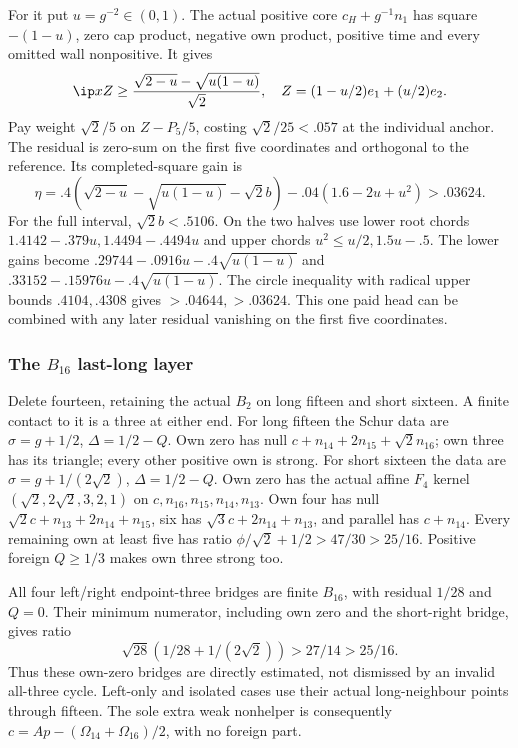 For it put \(u=g^{-2}\in(0,1)\). The actual positive core
\(c_H+g^{-1}n_1\) has square \(-(1-u)\), zero cap product,
negative own product, positive time and every omitted wall nonpositive.
It gives
\[
 \ip xZ\ge{\sqrt{2-u}-\sqrt{u(1-u)}\over\sqrt2},
 \quad Z=(1-u/2)e_1+(u/2)e_2.
\]
Pay weight \(\sqrt2/5\) on \(Z-P_5/5\), costing
\(\sqrt2/25<.057\) at the individual anchor. The residual
is zero-sum on the first five coordinates and orthogonal to the
reference. Its completed-square gain is
\[
 \eta=.4(\sqrt{2-u}-\sqrt{u(1-u)}-\sqrt2b)
                  -.04(1.6-2u+u^2)>.03624.
\]
For the full interval, \(\sqrt2b<.5106\). On the two halves use
lower root chords \(1.4142-.379u,1.4494-.4494u\) and upper
chords \(u^2\le u/2,1.5u-.5\). The lower gains become
\(.29744-.0916u-.4\sqrt{u(1-u)}\) and
\(.33152-.15976u-.4\sqrt{u(1-u)}\).
The circle inequality with radical upper bounds \(.4104,.4308\)
gives \(>.04644,>.03624\). This one paid head can be combined
with any later residual vanishing on the first five coordinates.

\subsubsection{The \(B_{16}\) last-long layer}
Delete fourteen, retaining the actual \(B_2\) on long fifteen
and short sixteen. A finite contact to it is a three at either end.
For long fifteen the Schur data are \(\sigma=g+1/2\),
\(\Delta=1/2-Q\). Own zero has null
\(c+n_{14}+2n_{15}+\sqrt2n_{16}\); own three has its triangle;
every other positive own is strong.
For short sixteen the data are \(\sigma=g+1/(2\sqrt2)\),
\(\Delta=1/2-Q\). Own zero has the actual affine \(F_4\)
kernel \((\sqrt2,2\sqrt2,3,2,1)\) on
\(c,n_{16},n_{15},n_{14},n_{13}\). Own four has null
\(\sqrt2c+n_{13}+2n_{14}+n_{15}\), six has
\(\sqrt3c+2n_{14}+n_{13}\), and parallel has \(c+n_{14}\).
Every remaining own at least five has ratio
\(\phi/\sqrt2+1/2>47/30>25/16\). Positive foreign
\(Q\ge1/3\) makes own three strong too.

All four left/right endpoint-three bridges are finite \(B_{16}\),
with residual \(1/28\) and \(Q=0\). Their minimum numerator,
including own zero and the short-right bridge, gives ratio
\[
 \sqrt{28}(1/28+1/(2\sqrt2))>27/14>25/16.
\]
Thus these own-zero bridges are directly estimated, not dismissed
by an invalid all-three cycle. Left-only and isolated cases use
their actual long-neighbour points through fifteen. The sole extra
weak nonhelper is consequently
\(c=Ap-(\Omega_{14}+\Omega_{16})/2\), with no foreign part.

